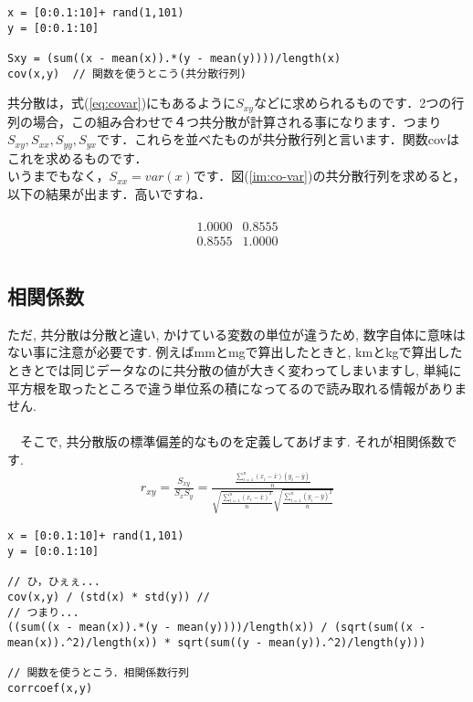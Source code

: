 \documentclass[11pt,a4paper]{ujreport}
\begin{document}
\begin{lstlisting}[caption=共分散のコード,label=sc:scatter keepspaces=true，]
x = [0:0.1:10]+ rand(1,101)
y = [0:0.1:10]

Sxy = (sum((x - mean(x)).*(y - mean(y))))/length(x)
cov(x,y)  // 関数を使うとこう(共分散行列)
\end{lstlisting}
共分散は，式(\ref{eq:covar})にもあるように$S_{xy}$などに求められるものです．2つの行列の場合，この組み合わせで４つ共分散が計算される事になります．つまり$S_{xy}, S_{xx}, S_{yy}, S_{yx}$です．これらを並べたものが共分散行列と言います．関数covはこれを求めるものです．\\
いうまでもなく，$S_{xx} = var(x)$です．図(\ref{im:co-var})の共分散行列を求めると，以下の結果が出ます．高いですね．

\begin{eqnarray}
\begin{matrix}
  1.0000 & 0.8555\\
  0.8555 & 1.0000\\
\end{matrix}
\end{eqnarray}

\subsection{相関係数}
ただ, 共分散は分散と違い, かけている変数の単位が違うため, 数字自体に意味はない事に注意が必要です. 例えばmmとmgで算出したときと, kmとkgで算出したときとでは同じデータなのに共分散の値が大きく変わってしまいますし, 単純に平方根を取ったところで違う単位系の積になってるので読み取れる情報がありません.\\
\\
　そこで, 共分散版の標準偏差的なものを定義してあげます. それが相関係数です.\\

\begin{eqnarray}
\label{eq:correlation}
r_{xy} = \frac{S_{xy}}{S_x S_y} = \frac{\frac{\sum_{i=1}^{n} (x_i - \bar{x})(y_i - \bar{y})}{n}}{\sqrt{\frac{\sum_{i=1}^{n} (x_i - \bar{x})^2}{n}} \sqrt{\frac{\sum_{i=1}^{n} (y_i - \bar{y})^2}{n}}}
\end{eqnarray}

\begin{lstlisting}[caption=共分散行列,label=sc:co-var]
x = [0:0.1:10]+ rand(1,101)
y = [0:0.1:10]

// ひ，ひぇぇ...
cov(x,y) / (std(x) * std(y)) // 
// つまり...
((sum((x - mean(x)).*(y - mean(y))))/length(x)) / (sqrt(sum((x - mean(x)).^2)/length(x)) * sqrt(sum((y - mean(y)).^2)/length(y)))

// 関数を使うとこう．相関係数行列
corrcoef(x,y)
\end{lstlisting}
\end{document}

